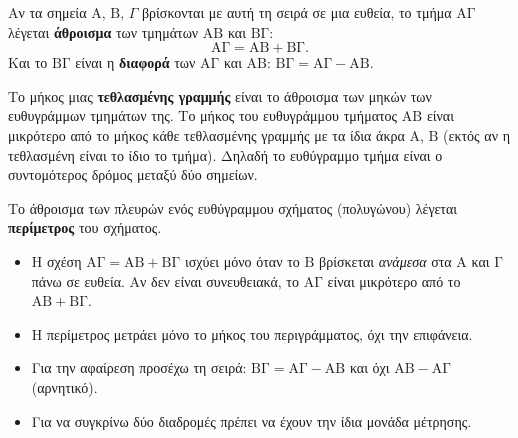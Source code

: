 
Αν τα σημεία $\mathrm{Α},\,\mathrm{Β},\,\Gamma$ βρίσκονται με αυτή τη σειρά σε μια ευθεία, το τμήμα $\mathrm{ΑΓ}$ λέγεται \textbf{άθροισμα} των τμημάτων $\mathrm{ΑΒ}$ και $\mathrm{ΒΓ}$:
$$\mathrm{ΑΓ}=\mathrm{ΑΒ}+\mathrm{ΒΓ}.$$
Και το $\mathrm{ΒΓ}$ είναι η \textbf{διαφορά} των $\mathrm{ΑΓ}$ και $\mathrm{ΑΒ}$: $\mathrm{ΒΓ}=\mathrm{ΑΓ}-\mathrm{ΑΒ}$.

\begin{center}
\end{center}


Το μήκος μιας \textbf{τεθλασμένης γραμμής} είναι το άθροισμα των μηκών των ευθυγράμμων τμημάτων της. Το μήκος του ευθυγράμμου τμήματος $\mathrm{ΑΒ}$ είναι μικρότερο από το μήκος κάθε τεθλασμένης γραμμής με τα ίδια άκρα $\mathrm{Α}$, $\mathrm{Β}$ (εκτός αν η τεθλασμένη είναι το ίδιο το τμήμα). Δηλαδή το ευθύγραμμο τμήμα είναι ο συντομότερος δρόμος μεταξύ δύο σημείων.

\begin{center}
\end{center}

Το άθροισμα των πλευρών ενός ευθύγραμμου σχήματος (πολυγώνου) λέγεται \textbf{περίμετρος} του σχήματος.

\begin{prosoxi}
\begin{itemize}[leftmargin=1.2em,itemsep=0.3ex,topsep=2pt]
\item Η σχέση $\mathrm{ΑΓ}=\mathrm{ΑΒ}+\mathrm{ΒΓ}$ ισχύει μόνο όταν το $\mathrm{Β}$ βρίσκεται \emph{ανάμεσα} στα $\mathrm{Α}$ και $\mathrm{Γ}$ πάνω σε ευθεία. Αν δεν είναι συνευθειακά, το $\mathrm{ΑΓ}$ είναι μικρότερο από το $\mathrm{ΑΒ}+\mathrm{ΒΓ}$.
\item Η περίμετρος μετράει μόνο το μήκος του περιγράμματος, όχι την επιφάνεια.
\item Για την αφαίρεση προσέχω τη σειρά: $\mathrm{ΒΓ}=\mathrm{ΑΓ}-\mathrm{ΑΒ}$ και όχι $\mathrm{ΑΒ}-\mathrm{ΑΓ}$ (αρνητικό).
\item Για να συγκρίνω δύο διαδρομές πρέπει να έχουν την ίδια μονάδα μέτρησης.
\end{itemize}
\end{prosoxi}

